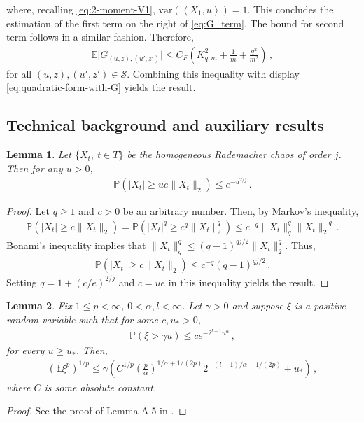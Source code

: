 \documentclass[12pt]{article}
\newcommand\var{\mathrm{var}}
\def\l{\left}
\def\r{\right}
\newcommand{\mb}{\mathbb}
\newcommand{\dotp}[2]{\left\langle#1,#2\right\rangle}
\newtheorem{lemma}{Lemma}
\theoremstyle{thmstyletwo}%
\theoremstyle{thmstylethree}%
\begin{document}
where, recalling \eqref{eq:2-moment-V1}, $\var\l(\dotp{X_1}{u}\r)=1$. This concludes the estimation of the first term on the right of \eqref{eq:G_term}. The bound for second term follows in a similar fashion. Therefore,
    \begin{align*}
        \mb E \lvert G_{(u,z), (u',z')}\rvert \leq C_F\l(K_{q,m}^2 + \frac{1}{m} + \frac{q^2}{m^2}\r)\,,
    \end{align*}
    for all $(u,z), (u',z') \in \bar{\mathcal{S}}$. Combining this inequality with display  \eqref{eq:quadratic-form-with-G} yields the result.
    


\subsection{Technical background and auxiliary results}
\label{section:tech-results}

\begin{lemma}
\label{lemma:tail_prob}
Let $\{X_t, \ t\in T\}$ be the homogeneous Rademacher chaos of order $j$. Then for any $u > 0$,
\begin{align*}
    \mb P\l(|X_t| \geq ue\|X_t\|_2\r) \leq e^{-u^{2/j}}\,.
\end{align*}
\end{lemma}

\begin{proof}
Let $q\geq 1$ and $c > 0$ be an arbitrary number. Then, by Markov's inequality,
\begin{align*}
    \mb P\l(|X_t| \geq c\|X_t\|_2\r) = \mb P\l(|X_t|^q \geq c^q\|X_t\|_2^q\r) \leq c^{-q}\|X_t\|^q_q \|X_t\|^{-q}_2\,.
\end{align*}
Bonami's inequality \citep[][Theorem 3.2.2]{de2012decoupling} implies that $\|X_t\|_q^q \leq (q-1)^{qj/2} \|X_t\|_2^q$. Thus, 
\begin{align*}
    \mb P\l(|X_t| \geq c\|X_t\|_2\r) \leq c^{-q}(q-1)^{qj/2}\,.
\end{align*}
Setting $q = 1 + (c/e)^{2/j}$ and $c=ue$ in this inequality yields the result.
\end{proof}

\begin{lemma}\label{lemma:compute_expectation}
    Fix $1 \leq p < \infty$, $0 < \alpha, l < \infty$. Let $\gamma > 0$ and suppose $\xi$ is a positive random variable such that for some $c, u_* > 0$,
    \begin{align*}
        \mb P(\xi > \gamma u) \leq c e^{-2^{l-1}u^\alpha} \,,
    \end{align*}
    for every $u \geq u_*$. Then,
    \begin{align*}
        \l(\mb E  \xi^p \r)^{1/p} \leq \gamma\l(C^{1/p}\l(\frac{p}{\alpha}\r)^{1/\alpha + 1/(2p)}2^{-(l-1)/\alpha - 1/(2p)} + u_*\r) \,,
    \end{align*}
    where $C$ is some absolute constant.
\end{lemma}
\begin{proof}
See the proof of Lemma A.5 in \cite{dirksen2015tail}. 
\end{proof}
\end{document}
